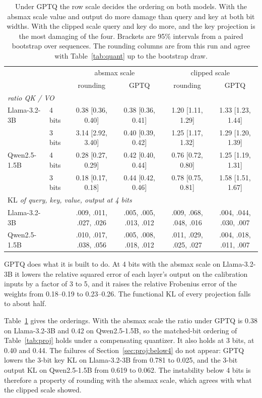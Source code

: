 \documentclass[journal]{IEEEtran}
\newcommand{\KL}{\mathrm{KL}}
\begin{document}
\begin{table}[t]
\centering
\caption{Under GPTQ the row scale decides the ordering on both models. With the absmax scale
value and output do more damage than query and key at both bit widths. With the clipped scale
query and key do more, and the key projection is the most damaging of the four. Brackets are 95\%
intervals from a paired bootstrap over sequences. The rounding columns are from this run and
agree with Table~\ref{tab:quant} up to the bootstrap draw.}
\label{tab:gptq}
\footnotesize
\setlength{\tabcolsep}{4pt}
\begin{tabular}{llcccc}
\toprule
 & & \multicolumn{2}{c}{absmax scale} & \multicolumn{2}{c}{clipped scale} \\
 & & rounding & GPTQ & rounding & GPTQ \\
\midrule
\multicolumn{6}{l}{\emph{ratio QK / VO}} \\
Llama-3.2-3B & 4 bits & 0.38 [0.36, 0.40] & 0.38 [0.36, 0.41] & 1.20 [1.11, 1.29] & 1.33 [1.23, 1.44] \\
 & 3 bits & 3.14 [2.92, 3.40] & 0.40 [0.39, 0.42] & 1.25 [1.17, 1.32] & 1.29 [1.20, 1.39] \\
Qwen2.5-1.5B & 4 bits & 0.28 [0.27, 0.29] & 0.42 [0.40, 0.44] & 0.76 [0.72, 0.80] & 1.25 [1.19, 1.31] \\
 & 3 bits & 0.18 [0.17, 0.18] & 0.44 [0.42, 0.46] & 0.78 [0.75, 0.81] & 1.58 [1.51, 1.67] \\
\midrule
\multicolumn{6}{l}{\emph{$\KL$ of query, key, value, output at 4 bits}} \\
Llama-3.2-3B & & .009, .011, .027, .026 & .005, .005, .013, .012 & .009, .068, .048, .016 & .004, .044, .030, .007 \\
Qwen2.5-1.5B & & .010, .017, .038, .056 & .005, .008, .018, .012 & .011, .029, .025, .027 & .004, .018, .011, .007 \\
\bottomrule
\end{tabular}
\end{table}

GPTQ does what it is built to do. At 4 bits with the absmax scale on Llama-3.2-3B it lowers the
relative squared error of each layer's output on the calibration inputs by a factor of 3 to 5,
and it raises the relative Frobenius error of the weights from 0.18--0.19 to 0.23--0.26. The
functional $\KL$ of every projection falls to about half.

Table~\ref{tab:gptq} gives the orderings. With the absmax scale the ratio under GPTQ is 0.38 on
Llama-3.2-3B and 0.42 on Qwen2.5-1.5B, so the matched-bit ordering of Table~\ref{tab:proj}
holds under a compensating quantizer. It also holds at 3 bits, at 0.40 and 0.44. The failures of
Section~\ref{sec:proj:below4} do not appear: GPTQ lowers the 3-bit key $\KL$ on Llama-3.2-3B
from 0.781 to 0.025, and the 3-bit output $\KL$ on Qwen2.5-1.5B from 0.619 to 0.062. The
instability below 4 bits is therefore a property of rounding with the absmax scale, which
agrees with what the clipped scale showed.
\end{document}
